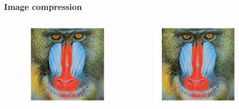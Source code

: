 \documentclass[xcolor={dvipsnames}]{beamer}
\begin{document}
\begin{frame}
\frametitle{Image compression}
\begin{columns}
\hspace{-0.25in}
\begin{figure}
\includegraphics[width=\textwidth]{figs/mandrill.png}
\end{figure}
\begin{figure}
\includegraphics[width=\textwidth]{figs/mandrill-100.png}
\end{figure}
\end{columns}
\end{frame}
\end{document}
